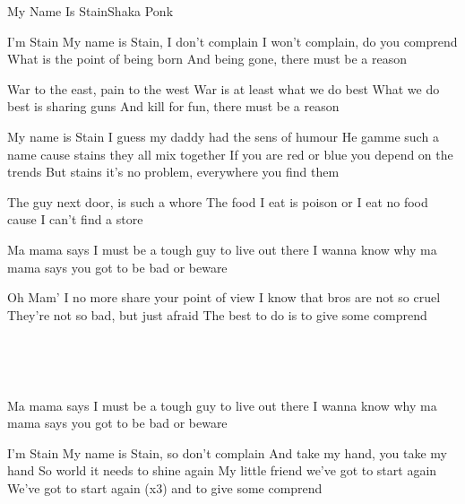 \begin{Song}{My Name Is Stain}{Shaka Ponk}

\begin{Verse}
I'm Stain
My name is Stain, I don't complain
I won't complain, do you comprend
What is the point of being born
And being gone, there must be a reason
\espaceInterStrophe

War to the east, pain to the west
War is at least what we do best
What we do best is sharing guns
And kill for fun, there must be a reason
\end{Verse}
\espaceInterStrophe

\begin{Chorus}
My name is Stain I guess my daddy had the sens of humour
He gamme such a name cause stains they all mix together
If you are red or blue you depend on the trends
But stains it's no problem, everywhere you find them
\end{Chorus}
\espaceInterStrophe

\begin{Verse}
The guy next door, is such a whore
The food I eat is poison or
I eat no food cause I can't find a store
\end{Verse}
\espaceInterStrophe

\begin{Chorus}
Ma mama says I must be a tough guy to live out there
I wanna know why ma mama says you got to be bad or beware
\end{Chorus}
\espaceInterStrophe

\begin{Verse}
Oh Mam'
I no more share your point of view
I know that bros are not so cruel
They're not so bad, but just afraid
The best to do is to give some comprend
\end{Verse}
\espaceInterStrophe

\\
\espaceInterStrophe

\tochorus\\
\espaceInterStrophe

\begin{Chorus}
Ma mama says I must be a tough guy to live out there
I wanna know why ma mama says you got to be bad or beware
\end{Chorus}
\espaceInterStrophe

\begin{Verse}
I'm Stain
My name is Stain, so don't complain
And take my hand, you take my hand
So world it needs to shine again
My little friend we've got to start again
We've got to start again (x3)
and to give some comprend
\end{Verse}


\end{Song}
